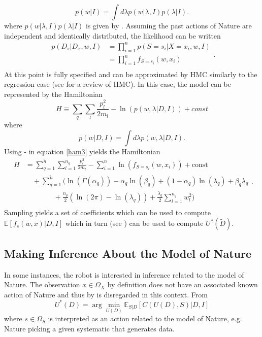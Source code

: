 \begin{equation}
	p(w|I) = \int d\lambda p(w|\lambda,I)p(\lambda|I).
\end{equation}
where $p(w|\lambda,I)p(\lambda|I)$ is given by . Assuming the past actions of Nature are independent and identically distributed, the likelihood can be written~\citep{Fischer1999} 
\begin{equation}
	\begin{split}
		p(D_s|D_x,w,I) &=\prod_{i=1}^{n}p(S = s_i|X = x_i,w,I)\\
		&=\prod_{i=1}^{n}f_{S = s_i}(w,x_i)\\
	\end{split}.
	\label{lik}
\end{equation}
At this point  is fully specified and can be approximated by HMC similarly to the regression case (see  for a review of HMC). In this case, the model can be represented by the Hamiltonian 
\begin{equation}
	H \equiv  \sum_{q}\sum_{l}\frac{p_{l}^2}{2m_{l}}-\ln(p(w,\lambda|D,I))+const
	\label{ham3}
\end{equation}
where
\begin{equation}
	p(w|D,I) = \int d\lambda p(w,\lambda|D,I).
\end{equation}
Using - in equation \eqref{ham3} yields the Hamiltonian
\begin{equation}
	\begin{split}
		H&=\sum_{q=1}^{\tilde{n}}\sum_{l=1}^{n_q}\frac{p_{l}^2}{2m_{l}}-\sum_{i=1}^{n}\ln(f_{S = s_i}(w,x_i))+\text{const}\\
		&\quad+\sum_{q=1}^{\tilde{n}}\bigg(\ln(\Gamma(\alpha_q))-\alpha_q\ln(\beta_q)+(1-\alpha_q)\ln(\lambda_q)+\beta_q\lambda_q\\
		&\qquad \qquad+\frac{n_q}{2}(\ln(2\pi)-\ln(\lambda_q))+\frac{\lambda_q}{2}\sum_{l=1}^{n_q}w_l^2\bigg)\\
	\end{split}.
	\label{ham2}
\end{equation}
Sampling  yields a set of coefficients which can be used to compute $\mathbb{E}[f_s(w,x)|D,I]$ which in turn (see ) can be used to compute $U^*(\tilde{D})$.


\subsection{Making Inference About the Model of Nature}
In some instances, the robot is interested in inference related to the model of Nature. The observation $x\in \Omega_X$ by definition does not have an associated known action of Nature and thus by  is disregarded in this context. From 
\begin{equation}
	U^*(D) = \arg\min_{U(D)} \mathbb{E}_{S|D}[C(U(D), S)|D,I]
	\label{eq:best_decision}
\end{equation}
where $s \in \Omega_S$ is interpreted as an action related to the model of Nature, e.g. Nature picking a given systematic that generates data.


